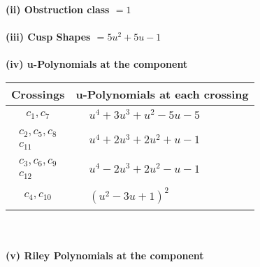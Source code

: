 \documentclass[1p]{elsarticle_modified}
\theoremstyle{definition}
\begin{document}
\flushleft \textbf{(ii) Obstruction class $= 1$}\\~\\
\flushleft \textbf{(iii) Cusp Shapes $= 5 u^2+5 u-1$}\\~\\
\newpage\renewcommand{\arraystretch}{1}
\flushleft \textbf{(iv) u-Polynomials at the component}\newline \\
\begin{tabular}{m{50pt}|m{274pt}}
Crossings & \hspace{64pt}u-Polynomials at each crossing \\
\hline $$\begin{aligned}c_{1},c_{7}\end{aligned}$$&$\begin{aligned}
&u^4+3 u^3+u^2-5 u-5
\end{aligned}$\\
\hline $$\begin{aligned}c_{2},c_{5},c_{8}\\c_{11}\end{aligned}$$&$\begin{aligned}
&u^4+2 u^3+2 u^2+u-1
\end{aligned}$\\
\hline $$\begin{aligned}c_{3},c_{6},c_{9}\\c_{12}\end{aligned}$$&$\begin{aligned}
&u^4-2 u^3+2 u^2- u-1
\end{aligned}$\\
\hline $$\begin{aligned}c_{4},c_{10}\end{aligned}$$&$\begin{aligned}
&(u^2-3 u+1)^2
\end{aligned}$\\
\hline
\end{tabular}\\~\\
\newpage\renewcommand{\arraystretch}{1}
\flushleft \textbf{(v) Riley Polynomials at the component}\newline \\
\end{document}

